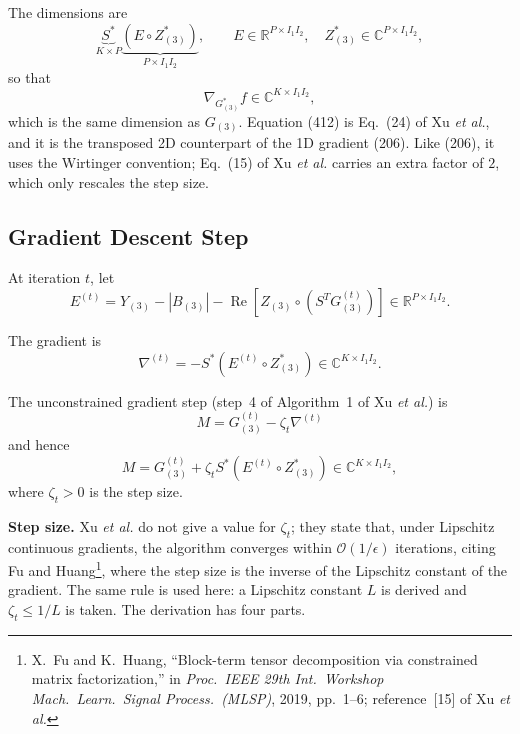 \documentclass[12pt,a4paper]{article}
\begin{document}
The dimensions are
\begin{equation}
\underbrace{S^{*}}_{K\times P}
\underbrace{\left(E\circ Z_{(3)}^{*}\right)}_{P\times I_1I_2},
\qquad
E\in\mathbb R^{P\times I_1I_2},
\quad
Z_{(3)}^{*}\in\mathbb C^{P\times I_1I_2},
\tag{413}
\end{equation}
so that
\begin{equation}
\nabla_{G_{(3)}^{*}}f
\in\mathbb C^{K\times I_1I_2},
\tag{414}
\end{equation}
which is the same dimension as $G_{(3)}$. Equation (412) is Eq.~(24) of
Xu \emph{et al.}, and it is the transposed 2D counterpart of the 1D
gradient (206). Like (206), it uses the Wirtinger convention; Eq.~(15)
of Xu \emph{et al.} carries an extra factor of $2$, which only rescales
the step size.

\subsection{Gradient Descent Step}

At iteration $t$, let
\begin{equation}
E^{(t)}
=
Y_{(3)}-|B_{(3)}|
-\operatorname{Re}\!\left[
Z_{(3)}\circ(S^TG_{(3)}^{(t)})
\right]
\in\mathbb R^{P\times I_1I_2}.
\tag{415}
\end{equation}

The gradient is
\begin{equation}
\boxed{
\nabla^{(t)}
=
-S^{*}\left(E^{(t)}\circ Z_{(3)}^{*}\right)
\in\mathbb C^{K\times I_1I_2}.
}
\tag{416}
\end{equation}

The unconstrained gradient step (step~4 of Algorithm~1 of Xu
\emph{et al.}) is
\begin{equation}
\boxed{
M
=
G_{(3)}^{(t)}
-\zeta_t\nabla^{(t)}
}
\tag{417}
\end{equation}
and hence
\begin{equation}
\boxed{
M
=
G_{(3)}^{(t)}
+\zeta_t S^{*}
\left(E^{(t)}\circ Z_{(3)}^{*}\right)
\in\mathbb C^{K\times I_1I_2},
}
\tag{418}
\end{equation}
where $\zeta_t>0$ is the step size.

\textbf{Step size.} Xu \emph{et al.} do not give a value for $\zeta_t$; they
state that, under Lipschitz continuous gradients, the algorithm converges
within $\mathcal O(1/\epsilon)$ iterations, citing Fu and
Huang\footnote{X.~Fu and K.~Huang, ``Block-term tensor decomposition via
constrained matrix factorization,'' in \emph{Proc.\ IEEE 29th Int.\ Workshop
Mach.\ Learn.\ Signal Process.\ (MLSP)}, 2019, pp.~1--6; reference~[15] of Xu
\emph{et al.}}, where the step size is the inverse of the Lipschitz constant
of the gradient. The same rule is used here: a Lipschitz constant $L$ is
derived and $\zeta_t\leq1/L$ is taken. The derivation has four parts.
\end{document}
